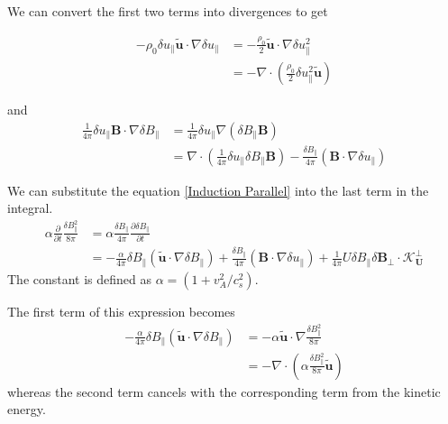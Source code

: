 We can convert the first two terms into divergences to get

\begin{equation*}
\begin{split}
    -\rho_{0} \delta u_{\parallel}  \tilde{\boldsymbol{u}}\cdot \nabla\delta u_{\parallel}
    &= -\frac{\rho_{0}}{2}  \tilde{\boldsymbol{u}}\cdot \nabla\delta u_{\parallel}^2\\
    &=- \nabla \cdot \left(\frac{\rho_{0}}{2}\delta u_{\parallel}^2  \tilde{\boldsymbol{u}} \right)
\end{split}
\end{equation*}

and 
\begin{equation*}
\begin{split}
    \frac{1}{4\pi}\delta u_{\parallel} \boldsymbol{B}\cdot \nabla \delta B_{\parallel}
    &=\frac{1}{4\pi}\delta u_{\parallel} \nabla (\delta B_{\parallel} \boldsymbol{B})\\
    &=\nabla \cdot \left(\frac{1}{4\pi}\delta u_{\parallel}\delta B_{\parallel} \boldsymbol{B} \right) - \frac{\delta B_{\parallel}}{4\pi}  (\boldsymbol{B}\cdot \nabla \delta u_{\parallel})
\end{split}
\end{equation*}

We can substitute the equation \eqref{Induction Parallel} into the last term in the integral.
\begin{equation*}
    \begin{split}
        \alpha\frac{\partial}{\partial t}\frac{\delta B_{\parallel}^2}{8\pi} 
        &= \alpha \frac{\delta B_{\parallel}}{4\pi}  \frac{\partial \delta B_{\parallel}}{\partial t} \\
        &= -\frac{\alpha}{4\pi} \delta B_{\parallel}( \tilde{\boldsymbol{u}} \cdot \nabla \delta B_{\parallel}) + \frac{\delta B_{\parallel}}{4\pi}  (\boldsymbol{B} \cdot \nabla \delta u_{\parallel}) + \frac{1}{4\pi} U\delta B_{\parallel} \delta \boldsymbol{B}_{\perp}\cdot \boldsymbol{\mathcal{K}^{\perp}_{U}}
    \end{split}
\end{equation*}
The constant is defined as \(\alpha = \left(1+ v_A^2/c_s^2\right)\). 

The first term of this expression becomes
\begin{equation*}
    \begin{split}
        -\frac{\alpha}{4\pi} \delta B_{\parallel}( \tilde{\boldsymbol{u}} \cdot \nabla \delta B_{\parallel})
        &=-\alpha\tilde{\boldsymbol{u}} \cdot \nabla \frac{\delta B_{\parallel}^2}{8\pi}\\
        &=-\nabla \cdot \left(\alpha \frac{\delta B_{\parallel}^2}{8\pi}  \tilde{\boldsymbol{u}} \right)
    \end{split}
\end{equation*}
whereas the second term cancels with the corresponding term from the kinetic energy.

